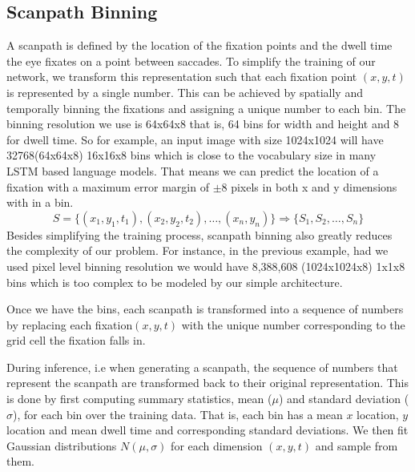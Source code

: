 \documentclass{article} %
\begin{document}
\subsection{Scanpath Binning}
A scanpath is defined by the location of the fixation points and the dwell time the eye fixates on a point between saccades. To simplify the training of our network, we transform this representation such that each fixation point $(x, y, t)$ is represented by a single number. This can be achieved by spatially and temporally binning the fixations and assigning a unique number to each bin. The binning resolution we use is 64x64x8 that is, 64 bins for width and height and 8 for dwell time. So for example, an input image with size 1024x1024 will have 32768(64x64x8) 16x16x8  bins which is close to the vocabulary size in many LSTM based language models. That means we can predict the location of a fixation with a maximum error margin of $\pm 8$ pixels in both x and y dimensions with in a bin.
\begin{equation}
S=\big\{(x_1, y_1, t_1), (x_2, y_2, t_2), \dots , (x_n, y_n)\big\} \Rightarrow \big\{S_1, S_2,\dots, S_n\big\}
\end{equation}
Besides simplifying the training process, scanpath binning also greatly reduces the complexity of our problem. For instance, in the previous example, had we used pixel level binning resolution we would have 8,388,608 (1024x1024x8) 1x1x8 bins which is too complex to be modeled by our simple architecture.

Once we have the bins, each scanpath is transformed into a sequence of numbers by replacing each fixation$(x, y, t)$ with the unique number corresponding to the grid cell the fixation falls in.

During inference, i.e when generating a scanpath, the sequence of numbers that represent the scanpath are transformed back to their original representation. This is done by first computing summary statistics, mean ($\mu$) and standard deviation ($\sigma$), for each bin over the training data. That is, each bin has a mean $x$ location, $y$ location and mean dwell time and corresponding standard deviations. We then fit Gaussian distributions $N(\mu, \sigma)$ for each dimension $(x, y, t)$ and sample from them.
\end{document}
